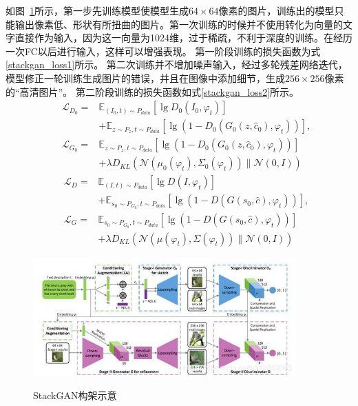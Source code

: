   如图~\ref{fig:StackGAN}所示，第一步先训练模型使模型生成$64\times 64$像素的图片，训练出的模型只能输出像素低、形状有所扭曲的图片。第一次训练的时候并不使用转化为向量的文字直接作为输入，因为这一向量为1024维，过于稀疏，不利于深度的训练。在经历一次FC以后进行输入，这样可以增强表现。
  第一阶段训练的损失函数为式\eqref{stackgan_loss1}所示。
  第二次训练并不增加噪声输入，经过多轮残差网络迭代，
  模型修正一轮训练生成图片的错误，并且在图像中添加细节，生成$256\times256$像素的“高清图片”。
  第二阶段训练的损失函数如式\eqref{stackgan_loss2}所示。
  \begin{equation}
    \begin{aligned}
      &&\mathcal{L}_{D_0} = & \mathbb{E}_{(I_0,t) \sim P_{data}}[\lg D_0 (I_0,\varphi_t)] \\ && &+\mathbb{E}_{z\sim P_z,t \sim P_{data}}[\lg (1-D_0(G_0(z, \hat{c}_0 ),\varphi_t))],
      \\
      &&\mathcal{L}_{G_0} = & \mathbb{E}_{z\sim P_z,t \sim P_{data}}[\lg (1-D_0(G_0(z, \hat{c}_0 ),\varphi_t))]  \\ && &+\lambda D_{KL}(\mathcal{N}(\mu_0(\varphi_t),\Sigma_0(\varphi_t))\parallel \mathcal{N}(0,I))
      \end{aligned}
    \label{stackgan_loss1}
  \end{equation}
  \begin{equation}
    \begin{aligned}
      &&\mathcal{L}_{D} = & \mathbb{E}_{(I,t) \sim P_{data}}[\lg D (I,\varphi_t)] \\ && &+\mathbb{E}_{s_0\sim P_{G_0},t \sim P_{data}}[\lg (1-D(G(s_0, \hat{c} ),\varphi_t))],
      \\
      &&\mathcal{L}_{G} = & \mathbb{E}_{s_0\sim P_{G_0},t \sim P_{data}}[\lg (1-D(G(s_0, \hat{c} ),\varphi_t))]  \\ && &+\lambda D_{KL}(\mathcal{N}(\mu(\varphi_t),\Sigma(\varphi_t))\parallel \mathcal{N}(0,I))
      \end{aligned}
    \label{stackgan_loss2}
  \end{equation}
    
  \begin{figure}[!htb]
    \centering
    \includegraphics[width=0.9\textwidth]{figures/StackGAN.jpg}\\
    \caption{StackGAN构架示意}
    \label{fig:StackGAN}
  \end{figure}


